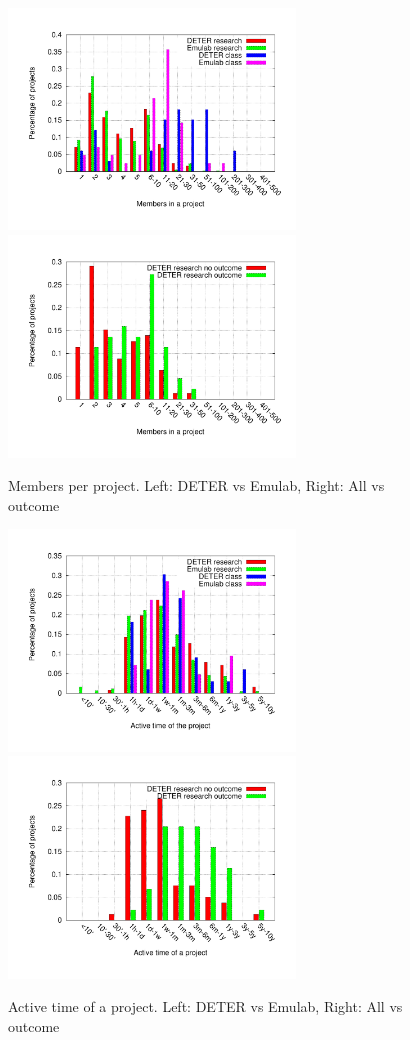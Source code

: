 \documentclass[10pt, twocolumn]{article} %
\begin{document}
\begin{figure}[htbp] \begin{center} \includegraphics[width=3in,
type=pdf,ext=.pdf,read=.pdf]{figs/proj.user.gnu}
\includegraphics[width=3in,
type=pdf,ext=.pdf,read=.pdf]{figs/proj.user.cmp.gnu} \caption{Members
per project. Left: DETER vs Emulab, Right: All vs outcome}
\label{projuser} \end{center} \end{figure}

\begin{figure}[htbp] \begin{center} \includegraphics[width=3in,
type=pdf,ext=.pdf,read=.pdf]{figs/proj.active.gnu}
\includegraphics[width=3in,
type=pdf,ext=.pdf,read=.pdf]{figs/proj.active.cmp.gnu} \caption{Active
time of a project. Left: DETER vs Emulab, Right: All vs outcome}
\label{projactive} \end{center} \end{figure}
\end{document}
